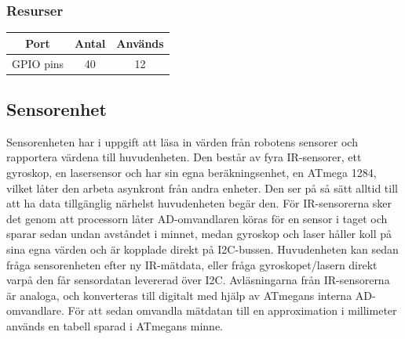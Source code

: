 \documentclass{article}
\begin{document}
\subsubsection{Resurser}

\begin{table}[H]
   \centering
  \begin{tabular}{ | c | c | c | }
    \hline
    \textbf{Port} & \textbf{Antal} & \textbf{Används} \\
    \hline
    GPIO pins & 40 & 12 \\
    \hline
  \end{tabular}
\end{table}

\subsection{Sensorenhet}
Sensorenheten har i uppgift att läsa in värden från robotens sensorer och rapportera värdena till huvudenheten. Den består av fyra IR-sensorer, ett gyroskop, en lasersensor och har sin egna beräkningsenhet, en ATmega 1284, vilket låter den arbeta asynkront från andra enheter. Den ser på så sätt alltid till att ha data tillgänglig närhelst huvudenheten begär den. För IR-sensorerna sker det genom att processorn låter AD-omvandlaren köras för en sensor i taget och sparar sedan undan avståndet i minnet, medan gyroskop och laser håller koll på sina egna värden och är kopplade direkt på I2C-bussen. Huvudenheten kan sedan fråga sensorenheten efter ny IR-mätdata, eller fråga gyroskopet/lasern direkt varpå den får sensordatan levererad över I2C.
\newline\newline
Avläsningarna från IR-sensorerna är analoga, och konverteras till digitalt med hjälp av ATmegans interna AD-omvandlare. För att sedan omvandla mätdatan till en approximation i millimeter används en tabell sparad i ATmegans minne.
\end{document}
